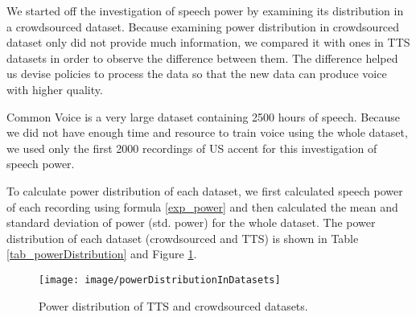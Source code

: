 \documentclass[12pt]{article}
\begin{document}
We started off the investigation of speech power by examining its distribution in a crowdsourced dataset. Because examining power distribution in crowdsourced dataset only did not provide much information, we compared it with ones in TTS datasets in order to observe the difference between them. The difference helped us devise policies to process the data so that the new data can produce voice with higher quality.

Common Voice is a very large dataset containing 2500 hours of speech. Because we did not have enough time and resource to train voice using the whole dataset, we used only the first 2000 recordings of US accent for this investigation of speech power.

To calculate power distribution of each dataset, we first calculated speech power of each recording using formula \ref{exp_power} and then calculated the mean and standard deviation of power (std. power) for the whole dataset. The power distribution of each dataset (crowdsourced and TTS) is shown in Table \ref{tab_powerDistribution} and Figure \ref{fig_powerDistribution}.

\begin{figure}[t]
\begin{center}
\texttt{[image: image/powerDistributionInDatasets]}
\end{center}
\vspace{-0.3cm}
\caption[Power distribution in TTS and crowdsourced datasets.]{Power distribution of TTS and crowdsourced datasets.}
\label{fig_powerDistribution}
\end{figure}
\end{document}
